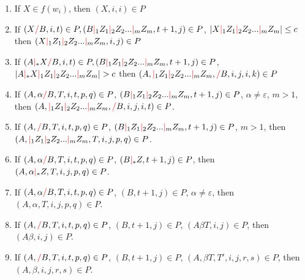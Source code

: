 \documentclass[12pt]{extarticle}
\theoremstyle{definition} \newtheorem{defn}{Definition}
\theoremstyle{definition} \newtheorem{prop}{Proposition}
\newcommand{\rc}{\textcolor{red}{/}}
\newcommand{\mc}{\textcolor{red}{|}}
\begin{document}
\begin{enumerate}
    \item If $X \in f(w_i)$, then $(X, i, i) \in P$
    \item If $(X \rc B, i, t) \in P, (B \mc_1 Z_1 \mc_2 Z_2 ... \mc_m Z_m, t + 1, j) \in P$,
        $|X \mc_1 Z_1 \mc_2 Z_2 ... \mc_m Z_m| \leq c$
        then $(X \mc_1 Z_1 \mc_2 Z_2 ... \mc_m Z_m, i, j) \in P$
    \item If $(A \mc_* X \rc B, i, t) \in P, (B \mc_1 Z_1 \mc_2 Z_2 ... \mc_m Z_m, t + 1, j) \in P$,
        $|A \mc_* X \mc_1 Z_1 \mc_2 Z_2 ... \mc_m Z_m| > c$
        then $(A, \mc_1 Z_1 \mc_2 Z_2 ... \mc_m Z_m, \rc B, i, j, i, k) \in P$
    \item If $(A, \alpha \rc B, T, i, t, p, q) \in P$,
        $(B \mc_1 Z_1 \mc_2 Z_2 ... \mc_m Z_m, t + 1, j) \in P$, $\alpha \neq \varepsilon$,
        $m > 1$, then $(A, \mc_1 Z_1 \mc_2 Z_2 ... \mc_m Z_m, \rc B, i, j, i, t) \in P$.
    \item If $(A, \rc B, T, i, t, p, q) \in P$,
        $(B \mc_1 Z_1 \mc_2 Z_2 ... \mc_m Z_m, t + 1, j) \in P$,
        $m > 1$, then $(A, \mc_1 Z_1 \mc_2 Z_2 ... \mc_m Z_m, T, i, j, p, q) \in P$.
    \item If $(A, \alpha \rc B, T, i, t, p, q) \in P$,
        $(B \mc_* Z, t + 1, j) \in P$,
        then $(A, \alpha \mc_* Z, T, i, j, p, q) \in P$.
    \item If $(A, \alpha \rc B, T, i, t, p, q) \in P$,
        $(B, t + 1, j) \in P$, $\alpha \neq \varepsilon$,
        then $(A, \alpha, T, i, j, p, q) \in P$.
    \item If $(A, \rc B, T, i, t, p, q) \in P$,
        $(B, t + 1, j) \in P$, $(A \beta T, i, j) \in P$,
        then $(A \beta, i, j) \in P$.
    \item If $(A, \rc B, T, i, t, p, q) \in P$,
        $(B, t + 1, j) \in P$, $(A, \beta T, T', i, j, r, s) \in P$,
        then $(A, \beta, i, j, r, s) \in P$.


\end{enumerate}
\end{document}
